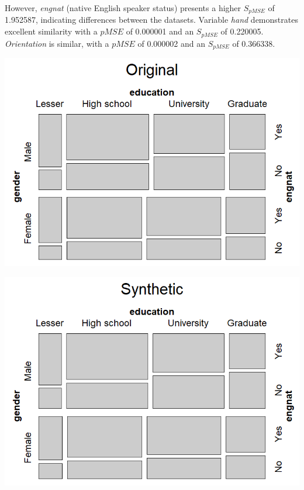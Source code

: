 \documentclass[a0,portrait]{a0poster}
\begin{document}
\begin{multicols}{3}
However, \textit{engnat} (native English speaker status) presents a higher $S_{pMSE}$ of 1.952587, indicating differences between the datasets. Variable \textit{hand} demonstrates excellent similarity with a $pMSE$ of 0.000001 and an $S_{pMSE}$ of 0.220005. \textit{Orientation} is similar, with a $pMSE$ of 0.000002 and an $S_{pMSE}$ of 0.366338.



\columnbreak %

\includegraphics[width=1\linewidth]{Poster TEX/figures/Mosaic_orig_v5.png}

\includegraphics[width=1\linewidth]{Poster TEX/figures/Mosaic_synt_v5.png}


\end{multicols}
\end{document}

